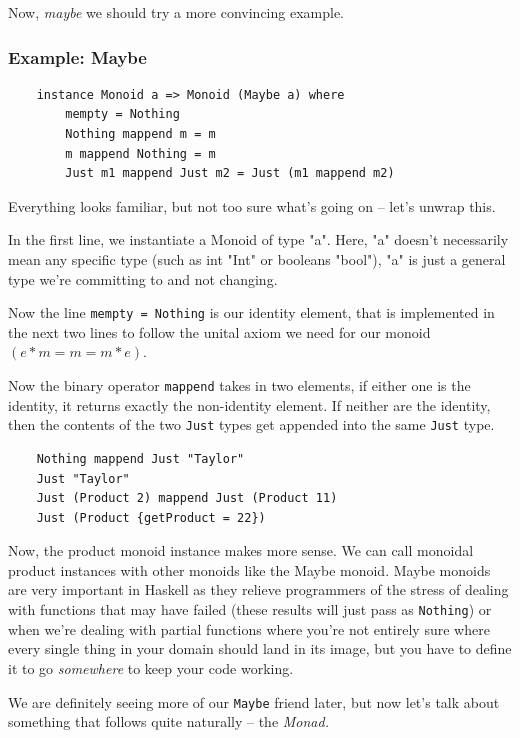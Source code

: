 \hfill

Now, \textit{maybe} we should try a more convincing example.

\subsubsection{Example: Maybe}
\begin{lstlisting}
    instance Monoid a => Monoid (Maybe a) where
        mempty = Nothing
        Nothing mappend m = m
        m mappend Nothing = m
        Just m1 mappend Just m2 = Just (m1 mappend m2)
\end{lstlisting}
Everything looks familiar, but not too sure what's going on -- let's unwrap this.

In the first line, we instantiate a Monoid of type "a". Here, "a" doesn't necessarily mean any specific type (such as int "Int" or booleans "bool"), "a" is just a general type we're committing to and not changing.

Now the line \lstinline{mempty = Nothing} is our identity element, that is implemented in the next two lines to follow the unital axiom we need for our monoid $(e*m = m = m * e)$.

Now the binary operator \lstinline{mappend} takes in two elements, if either one is the identity, it returns exactly the non-identity element. If neither are the identity, then the contents of the two \lstinline{Just} types get appended into the same \lstinline{Just} type.
\begin{lstlisting}
    Nothing mappend Just "Taylor"
    Just "Taylor"
    Just (Product 2) mappend Just (Product 11)
    Just (Product {getProduct = 22})
\end{lstlisting}

Now, the product monoid instance makes more sense. We can call monoidal product instances with other monoids like the Maybe monoid. Maybe monoids are very important in Haskell as they relieve programmers of the stress of dealing with functions that may have failed (these results will just pass as \lstinline{Nothing}) or when we're dealing with partial functions where you're not entirely sure where every single thing in your domain should land in its image, but you have to define it to go \textit{somewhere} to keep your code working.

We are definitely seeing more of our \lstinline{Maybe} friend later, but now let's talk about something that follows quite naturally -- the \textit{Monad.}